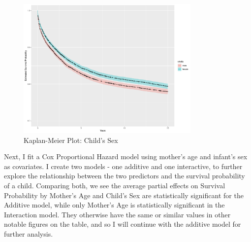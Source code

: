 \documentclass[12pt,letterpaper]{article}
\begin{document}
\begin{figure}[!htpb]
	\centering
	\includegraphics[width=0.8\textwidth]{sex.pdf}
	\caption{Kaplan-Meier Plot: Child's Sex}
	\label{fig:sex}
\end{figure}

\newpage
\noindent Next, I fit a Cox Proportional Hazard model using mother's age and infant's sex as covariates. I create two models - one additive and one interactive, to further explore the relationship between the two predictors and the survival probability of a child. Comparing both, we see the average partial effects on Survival Probability by Mother's Age and Child's Sex are statistically significant for the Additive model, while only Mother's Age is statistically significant in the Interaction model. They otherwise have the same or similar values in other notable figures on the table, and so I will continue with the additive model for further analysis.

\vspace{.25cm}
\end{document}
